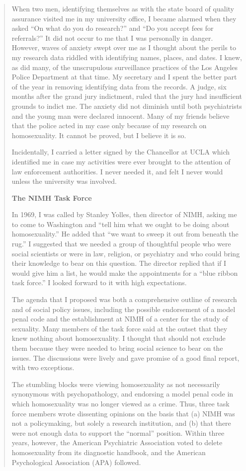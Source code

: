 \begin{quote}
When two men, identifying themselves as with the state board of quality assurance visited me in my university office, I became alarmed when they asked ``On what do you do research?'' and ``Do you accept fees for referrals?'' It did not occur to me that I was personally in danger. However, waves of anxiety swept over me as I thought about the perils to my research data riddled with identifying names, places, and dates. I knew, as did many, of the unscrupulous surveillance practices of the Los Angeles Police Department at that time. My secretary and I spent the better part of the year in removing identifying data from the records. A judge, six months after the grand jury indictment, ruled that the jury had insufficient grounds to indict me. The anxiety did not diminish until both psychiatrists and the young man were declared innocent. Many of my friends believe that the police acted in my case only because of my research on homosexuality. It cannot be proved, but I believe it is so.

Incidentally, I carried a letter signed by the Chancellor at UCLA which identified me in case my activities were ever brought to the attention of law enforcement authorities. I never needed it, and felt I never would unless the university was involved.

\textbf{The NIMH Task Force} 

In 1969, I was called by Stanley Yolles, then director of NIMH, asking me to come to Washington and ``tell him what we ought to be doing about homosexuality.'' He added that ``we want to sweep it out from beneath the rug.'' I suggested that we needed a group of thoughtful people who were social scientists or were in law, religion, or psychiatry and who could bring their knowledge to bear on this question. The director replied that if I would give him a list, he would make the appointments for a ``blue ribbon task force.'' I looked forward to it with high expectations.

The agenda that I proposed was both a comprehensive outline of research and of social policy issues, including the possible endorsement of a model penal code and the establishment at NIMH of a center for the study of sexuality. Many members of the task force said at the outset that they knew nothing about homosexuality. I thought that should not exclude them because they were needed to bring social science to bear on the issues. The discussions were lively and gave promise of a good final report, with two exceptions.

The stumbling blocks were viewing homosexuality as not necessarily synonymous with psychopathology, and endorsing a model penal code in which homosexuality was no longer viewed as a crime. Thus, three task force members wrote dissenting opinions on the basis that (a) NIMH was not a policymaking, but solely a research institution, and (b) that there were not enough data to support the ``normal'' position. Within three years, however, the American Psychiatric Association voted to delete homosexuality from its diagnostic handbook, and the American Psychological Association (APA) followed.


\end{quote}
